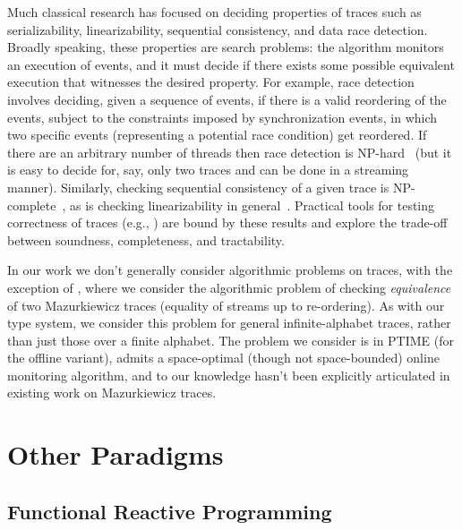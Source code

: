 Much classical research has focused on deciding properties of traces such as serializability, linearizability, sequential consistency, and data race detection.
Broadly speaking, these properties are search problems: the algorithm monitors an execution of events, and it must decide if there exists some possible equivalent execution that witnesses the desired property. For example, race detection involves deciding, given a sequence of events, if there is a valid reordering of the events, subject to the constraints imposed by synchronization events, in which two specific events (representing a potential race condition) get reordered. If there are an arbitrary number of threads then race detection is NP-hard~\cite{netzer1990complexity,netzer1992race}
(but it is easy to decide for, say, only two traces and can be done in a streaming manner).
Similarly, checking sequential consistency of a given trace is NP-complete~\cite{gibbons1992complexity},
as is checking linearizability in general~\cite{gibbons1997testing}.
Practical tools for testing correctness of traces (e.g., \cite{savage1997eraser,park2011efficient,sen2008race,wing1993testing,burckhardt2010line,lowe2017testing}) are bound by these results and explore the trade-off between soundness, completeness, and tractability.

In our work we don't generally consider algorithmic problems on traces, with the exception of ,
where we consider the algorithmic problem of checking \emph{equivalence} of two Mazurkiewicz traces (equality of streams up to re-ordering).
As with our type system, we consider this problem for general infinite-alphabet traces, rather than just those over a finite alphabet.
The problem we consider is in PTIME (for the offline variant), admits a space-optimal (though not space-bounded) online monitoring algorithm,
and to our knowledge hasn't been explicitly articulated in existing work on Mazurkiewicz traces.

\section{Other Paradigms}

\subsection{Functional Reactive Programming}

